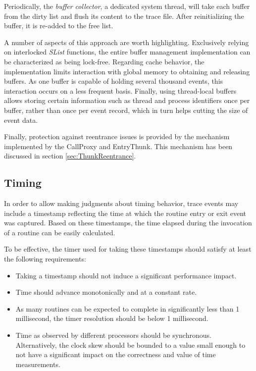 Periodically, the \emph{buffer collector}, a dedicated system thread, will take 
each buffer from the dirty list and flush its content to the trace file. 
After reinitializing the buffer, it is re-added to the free list.

A number of aspects of this approach are worth highlighting. Exclusively relying
on interlocked \emph{SList} functions, the entire buffer management implementation can be
characterized as being lock-free. Regarding cache behavior, the implementation limits
interaction with global memory to obtaining and releasing buffers. As one buffer
is capable of holding several thousand events, this interaction occurs on a less 
frequent basis. Finally, using thread-local buffers allows storing certain information
such as thread and process identifiers once per buffer, rather than once per event
record, which in turn helps cutting the size of event data.

Finally, protection against reentrance issues is provided by the mechanism
implemented by the CallProxy and EntryThunk. This mechanism has been discussed
in section \ref{sec:ThunkReentrance}.

\subsection{Timing}
In order to allow making judgments about timing behavior, trace events 
may include a timestamp reflecting the time at which the routine 
entry or exit event was captured. Based on these timestamps, the time
elapsed during the invocation of a routine can be easily calculated.

To be effective, the timer used for taking these timestamps should satisfy 
at least the following requirements:
\begin{itemize}
	\item Taking a timestamp should not induce a significant performance impact.
	\item Time should advance monotonically and at a constant rate.
	\item As many routines can be expected to complete in significantly less 
				than 1 millisecond, the timer resolution should be below 1 millisecond.
	\item Time as observed by different processors should be synchronous. Alternatively, the 
				clock skew should be bounded to a value small enough to not have a 
				significant impact on the correctness and value of time measurements.
\end{itemize}

